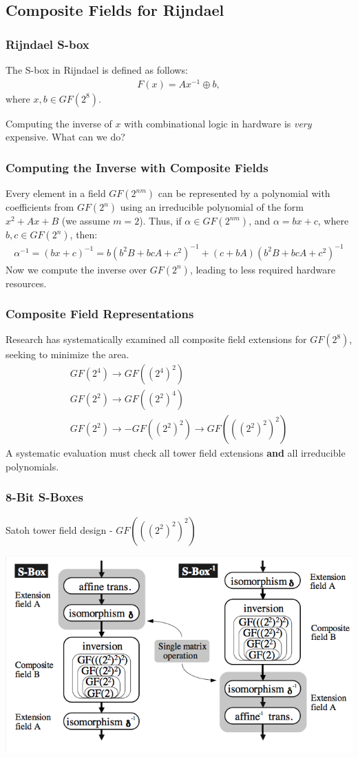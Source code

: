 \documentclass[handout]{beamer}
\begin{document}
\subsection{Composite Fields for Rijndael}
\begin{frame}
\frametitle{Rijndael S-box}
The S-box in Rijndael is defined as follows:
\begin{align*}
F(x) = Ax^{-1} \oplus b,
\end{align*}
where $x, b \in GF(2^8)$.

\medskip

Computing the inverse of $x$ with combinational logic in hardware is \emph{very} expensive. What can we do?
\end{frame}

\begin{frame}
	\frametitle{Computing the Inverse with Composite Fields}
	Every element in a field $GF(2^{nm})$ can be represented by a polynomial with coefficients from $GF(2^n)$ using 
	an irreducible polynomial of the form $x^2 + Ax + B$ (we assume $m = 2$). Thus, if $\alpha \in GF(2^{nm})$, and $\alpha = bx + c$, where $b,c \in GF(2^n)$, then:
	\begin{align*}
	\alpha^{-1} = (bx + c)^{-1} = b(b^2B + bcA + c^2)^{-1} + (c + bA)(b^2B + bcA + c^2)^{-1}
	\end{align*}
	\pause
	Now we compute the inverse over $GF(2^n)$, leading to less required hardware resources.
\end{frame}

\begin{frame}
\frametitle{Composite Field Representations}
Research has systematically examined all composite field extensions for $GF(2^8)$, seeking to minimize the area.
\begin{align*}
GF(2^4) \to GF((2^4)^2) \\
GF(2^2) \to GF((2^2)^4) \\
GF(2^2) \to- GF((2^2)^2) \to GF(((2^2)^2)^2)
\end{align*}
A systematic evaluation must check all tower field extensions \textbf{and} all irreducible polynomials.
\end{frame}

\begin{frame}
	\frametitle{8-Bit S-Boxes}
	Satoh tower field design - $GF(((2^2)^2)^2)$
	\begin{center}
	\includegraphics[scale=.35]{./images/tower8bit.png}
	\end{center}
\end{frame}
\end{document}
